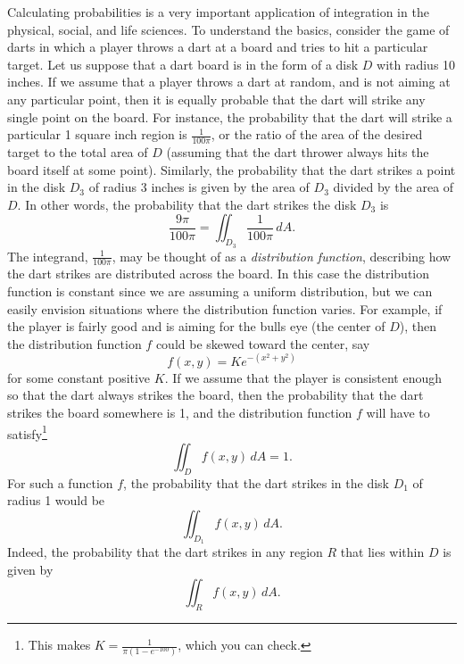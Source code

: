 Calculating probabilities is a very important application of integration in the physical, social, and life sciences. To understand the basics, consider the game of darts in which a player throws a dart at a board and tries to hit a particular target. Let us suppose that a dart board is in the form of a disk $D$ with radius 10 inches. If we assume that a player throws a dart at random, and is not aiming at any particular point, then it is equally probable that the dart will strike any single point on the board. For instance, the probability that the dart will strike a particular 1 square inch region is $\frac{1}{100 \pi}$, or the ratio of the area of the desired target to the total area of $D$ (assuming that the dart thrower always hits the board itself at some point). Similarly, the probability that the dart strikes a point in the disk $D_3$ of radius 3 inches is given by the area of $D_3$ divided by the area of $D$. In other words, the probability that the dart strikes the disk $D_3$ is
\[\frac{9 \pi}{100\pi} = \iint_{D_3} \frac{1}{100 \pi} \, dA.\]
The integrand, $\frac{1}{100\pi}$, may be thought of as a \emph{distribution function}, describing how the dart strikes are distributed across the board. In this case the distribution function is constant since we are assuming a uniform distribution, but we can easily envision situations where the distribution function varies.  For example, if the player is fairly good and is aiming for the bulls eye (the center of $D$), then the distribution function $f$ could be skewed toward the center, say
\[f(x,y) = K e^{-(x^2+y^2)}\]
for some constant positive $K$. If we assume that the player is consistent enough so that the dart always strikes the board, then the probability that the dart strikes the board somewhere is 1, and the distribution function $f$ will have to satisfy\footnote{This makes $K = \frac{1}{\pi\left(1-e^{-100}\right)}$, which you can check.}
\[\iint_D f(x,y) \, dA = 1.\]
For such a function $f$, the probability that the dart strikes in the disk $D_1$ of radius 1 would be
\[\iint_{D_1} f(x,y) \, dA.\]
Indeed, the probability that the dart strikes in any region $R$ that lies within $D$ is given by
\[\iint_R f(x,y) \, dA.\]

